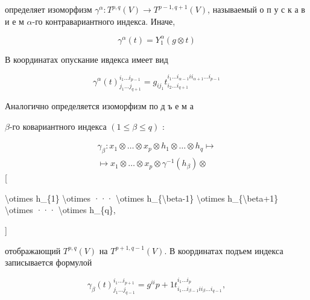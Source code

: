 \documentclass[10pt]{article}
\begin{document}
определяет изоморфизм $\gamma^{\alpha}: T^{p, q}(V) \rightarrow T^{p-1, q+1}(V)$, называемый о п у с к а в и е м $\alpha$-го контравариантного индекса. Иначе,



\[

\gamma^{\alpha}(t)=Y_{1}^{\alpha}(g \otimes t)

\]



В координатах опускание ивдекса имеет вид



\[

\gamma^{\alpha}(t)_{j_{1} \ldots j_{q+1}}^{i_{1} \ldots i_{p-1}}=g_{i j_{1}} t_{i_{2} \ldots i_{q+1}}^{i_{1} \ldots i_{\alpha-1} i i_{\alpha+1} \ldots i_{p-1}}

\]



Аналогично определяется изоморфизм по д ъ е м а



$\beta$-го ковариантного индекса $(1 \leqslant \beta \leqslant q)$ :



\[

\begin{gathered}

\gamma_{\beta}: x_{1} \otimes \ldots \otimes x_{p} \otimes h_{1} \otimes \ldots \otimes h_{q} \mapsto \\

\mapsto x_{1} \otimes \ldots \otimes x_{p} \otimes \gamma^{-1}\left(h_{\beta}\right) \otimes

\end{gathered}

\][



\textbackslash otimes h\_\{1\} \textbackslash otimes ··· \textbackslash otimes h\_\{\textbackslash beta-1\} \textbackslash otimes h\_\{\textbackslash beta+1\} \textbackslash otimes ··· \textbackslash otimes h\_\{q\},

]



отображающий $T^{p, q}(V)$ на $T^{p+1, q-1}(V)$. В координатах подъем индекса записывается формулой



\[

\gamma_{\beta}(t)_{j_{1} \ldots j_{q-1}}^{i_{1} \ldots i_{p+1}}=g^{i i} p+1 t_{i_{1} \ldots i_{\beta-1} i i_{\beta} \ldots i_{q-1}}^{i_{1} \ldots i_{p}},

\]
\end{document}
